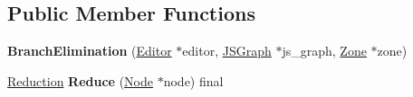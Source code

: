 \subsection*{Public Member Functions}
\begin{DoxyCompactItemize}
\item 
{\bfseries Branch\+Elimination} (\hyperlink{classv8_1_1internal_1_1compiler_1_1_advanced_reducer_1_1_editor}{Editor} $\ast$editor, \hyperlink{classv8_1_1internal_1_1compiler_1_1_j_s_graph}{J\+S\+Graph} $\ast$js\+\_\+graph, \hyperlink{classv8_1_1internal_1_1_zone}{Zone} $\ast$zone)\hypertarget{classv8_1_1internal_1_1compiler_1_1_branch_elimination_a49ff5c2473b3d3368e39bb24e9848457}{}\label{classv8_1_1internal_1_1compiler_1_1_branch_elimination_a49ff5c2473b3d3368e39bb24e9848457}

\item 
\hyperlink{classv8_1_1internal_1_1compiler_1_1_reduction}{Reduction} {\bfseries Reduce} (\hyperlink{classv8_1_1internal_1_1compiler_1_1_node}{Node} $\ast$node) final\hypertarget{classv8_1_1internal_1_1compiler_1_1_branch_elimination_a70c51071a0c2e78e9a4fe29725ef58a4}{}\label{classv8_1_1internal_1_1compiler_1_1_branch_elimination_a70c51071a0c2e78e9a4fe29725ef58a4}

\end{DoxyCompactItemize}

